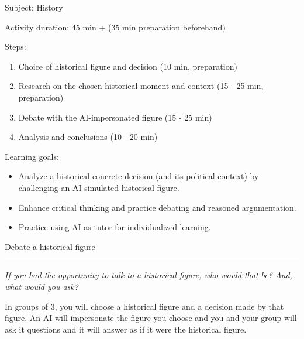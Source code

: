 \documentclass[12pt]{article}
\newcounter{question}
\begin{document}
\vspace*{0.5\textheight}

Subject: History

Activity duration: 45 min + (35 min preparation beforehand)

\vspace{0.5cm}

Steps:
\begin{enumerate}
    \item Choice of historical figure and decision (10 min, preparation)
    \item Research on the chosen historical moment and context (15 - 25 min, preparation)
    \item Debate with the AI-impersonated figure (15 - 25 min)
    \item Analysis and conclusions (10 - 20 min)

\end{enumerate}

Learning goals:

\begin{itemize}
    \item Analyze a historical concrete decision (and its political context) by challenging an AI-simulated historical figure.
    \item Enhance critical thinking and practice debating and reasoned argumentation.
    \item Practice using AI as tutor for individualized learning.
\end{itemize}

\newpage

\begin{center}
    {\Huge \color{maincolor} Debate a historical figure}\\[5pt]
    \rule{\linewidth}{1pt}
\end{center}

\vspace{0.5cm}

\textit{If you had the opportunity to talk to a historical figure, who would that be? And, what would you ask?}

\vspace{0.3cm}

In groups of 3, you will choose a historical figure and a decision made by that figure. An AI will impersonate the figure you choose and you and your group will ask it questions and it will answer as if it were the historical figure.
\end{document}

